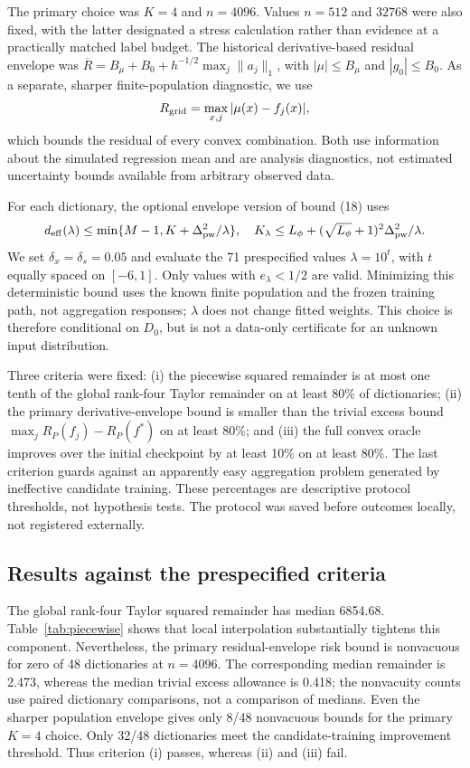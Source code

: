 \documentclass[pdflatex,sn-mathphys-ay]{sn-jnl}
\theoremstyle{remark}\newtheorem{remark}[theorem]{Remark}
\begin{document}
The primary choice was $K=4$ and $n=4096$. Values $n=512$ and $32768$ were also fixed, with the latter designated a stress calculation rather than evidence at a practically matched label budget. The historical derivative-based residual envelope was $\overline R=B_\mu+B_0+h^{-1/2}\max_j\|a_j\|_1$, with $|\mu|\leq B_\mu$ and $|g_0|\leq B_0$. As a separate, sharper finite-population diagnostic, we use
\[
 R_{\rm grid}=\max_{x,j}|\mu(x)-f_j(x)|,
\]
which bounds the residual of every convex combination. Both use information about the simulated regression mean and are analysis diagnostics, not estimated uncertainty bounds available from arbitrary observed data.

For each dictionary, the optional envelope version of bound (18) uses
\[
 d_{\rm eff}(\lambda)\leq\min\{M-1,K+\Delta_{\rm pw}^2/\lambda\},\quad
 K_\lambda\leq L_\phi+(\sqrt{L_\phi}+1)^2\Delta_{\rm pw}^2/\lambda.
\]
We set $\delta_x=\delta_s=0.05$ and evaluate the 71 prespecified values $\lambda=10^t$, with $t$ equally spaced on $[-6,1]$. Only values with $e_\lambda<1/2$ are valid. Minimizing this deterministic bound uses the known finite population and the frozen training path, not aggregation responses; $\lambda$ does not change fitted weights. This choice is therefore conditional on $D_0$, but is not a data-only certificate for an unknown input distribution.

Three criteria were fixed: (i) the piecewise squared remainder is at most one tenth of the global rank-four Taylor remainder on at least 80\% of dictionaries; (ii) the primary derivative-envelope bound is smaller than the trivial excess bound $\max_jR_P(f_j)-R_P(f^*)$ on at least 80\%; and (iii) the full convex oracle improves over the initial checkpoint by at least 10\% on at least 80\%. The last criterion guards against an apparently easy aggregation problem generated by ineffective candidate training. These percentages are descriptive protocol thresholds, not hypothesis tests. The protocol was saved before outcomes locally, not registered externally.

\subsection{Results against the prespecified criteria}
The global rank-four Taylor squared remainder has median 6854.68. Table~\ref{tab:piecewise} shows that local interpolation substantially tightens this component. Nevertheless, the primary residual-envelope risk bound is nonvacuous for zero of 48 dictionaries at $n=4096$. The corresponding median remainder is 2.473, whereas the median trivial excess allowance is 0.418; the nonvacuity counts use paired dictionary comparisons, not a comparison of medians. Even the sharper population envelope gives only 8/48 nonvacuous bounds for the primary $K=4$ choice. Only 32/48 dictionaries meet the candidate-training improvement threshold. Thus criterion (i) passes, whereas (ii) and (iii) fail.
\end{document}
